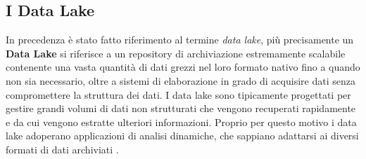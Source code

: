 \subsection{I Data Lake}

In precedenza è stato fatto riferimento al termine \textit{data lake}, più precisamente un \textbf{Data Lake} si riferisce a un repository di archiviazione estremamente scalabile contenente una vasta quantità di dati grezzi nel loro formato nativo fino a quando non sia necessario, oltre a sistemi di elaborazione in grado di acquisire dati senza compromettere la struttura dei dati. I data lake sono tipicamente progettati per gestire grandi volumi di dati non strutturati che vengono recuperati rapidamente e da cui vengono estratte ulteriori informazioni. Proprio per questo motivo i data lake adoperano applicazioni di analisi dinamiche, che sappiano adattarsi ai diversi formati di dati archiviati \cite{sciencedirect_data_lake}.

